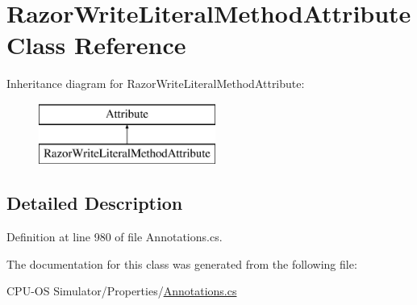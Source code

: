 \hypertarget{class_razor_write_literal_method_attribute}{}\section{Razor\+Write\+Literal\+Method\+Attribute Class Reference}
\label{class_razor_write_literal_method_attribute}
Inheritance diagram for Razor\+Write\+Literal\+Method\+Attribute\+:\begin{figure}[H]
\begin{center}
\leavevmode
\includegraphics[height=2.000000cm]{class_razor_write_literal_method_attribute}
\end{center}
\end{figure}


\subsection{Detailed Description}


Definition at line 980 of file Annotations.\+cs.



The documentation for this class was generated from the following file\+:\begin{DoxyCompactItemize}
\item 
C\+P\+U-\/\+O\+S Simulator/\+Properties/\hyperlink{_annotations_8cs}{Annotations.\+cs}\end{DoxyCompactItemize}
